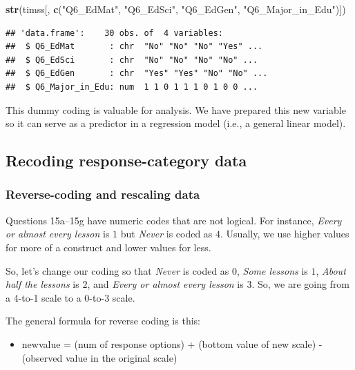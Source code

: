 \documentclass[
]{article}
\newenvironment{Shaded}{\begin{snugshade}}{\end{snugshade}}
\newcommand{\KeywordTok}[1]{\textcolor[rgb]{0.13,0.29,0.53}{\textbf{#1}}}
\newcommand{\NormalTok}[1]{#1}
\newcommand{\StringTok}[1]{\textcolor[rgb]{0.31,0.60,0.02}{#1}}
\providecommand{\tightlist}{%
  \setlength{\itemsep}{0pt}\setlength{\parskip}{0pt}}
\begin{document}
\begin{Shaded}
\begin{Highlighting}[]
\KeywordTok{str}\NormalTok{(timss[, }\KeywordTok{c}\NormalTok{(}\StringTok{"Q6_EdMat"}\NormalTok{, }\StringTok{"Q6_EdSci"}\NormalTok{, }\StringTok{"Q6_EdGen"}\NormalTok{, }\StringTok{"Q6_Major_in_Edu"}\NormalTok{)])}
\end{Highlighting}
\end{Shaded}

\begin{verbatim}
## 'data.frame':    30 obs. of  4 variables:
##  $ Q6_EdMat       : chr  "No" "No" "No" "Yes" ...
##  $ Q6_EdSci       : chr  "No" "No" "No" "No" ...
##  $ Q6_EdGen       : chr  "Yes" "Yes" "No" "No" ...
##  $ Q6_Major_in_Edu: num  1 1 0 1 1 1 0 1 0 0 ...
\end{verbatim}

This dummy coding is valuable for analysis. We have prepared this new variable so it can serve as a predictor in a regression model (i.e., a general linear model).

\hypertarget{recoding-response-category-data}{%
\subsection{Recoding response-category data}\label{recoding-response-category-data}}

\hypertarget{reverse-coding-and-rescaling-data}{%
\subsubsection{Reverse-coding and rescaling data}\label{reverse-coding-and-rescaling-data}}

Questions 15a--15g have numeric codes that are not logical. For instance, \emph{Every or almost every lesson} is \(1\) but \emph{Never} is coded as \(4\). Usually, we use higher values for more of a construct and lower values for less.

So, let's change our coding so that \emph{Never} is coded as \(0\), \emph{Some lessons} is \(1\), \emph{About half the lessons} is \(2\), and \emph{Every or almost every lesson} is \(3\). So, we are going from a 4-to-1 scale to a 0-to-3 scale.

The general formula for reverse coding is this:

\begin{itemize}
\tightlist
\item
  newvalue = (num of response options) + (bottom value of new scale) - (observed value in the original scale)
\end{itemize}
\end{document}

